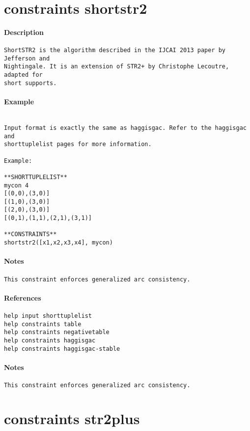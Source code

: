 \section{constraints shortstr2}
\paragraph{Description}
{\footnotesize
\begin{verbatim}
ShortSTR2 is the algorithm described in the IJCAI 2013 paper by Jefferson and
Nightingale. It is an extension of STR2+ by Christophe Lecoutre, adapted for
short supports.
\end{verbatim}
}
\paragraph{Example}
{\footnotesize
\begin{verbatim}

Input format is exactly the same as haggisgac. Refer to the haggisgac and
shorttuplelist pages for more information.

Example:

**SHORTTUPLELIST**
mycon 4
[(0,0),(3,0)]
[(1,0),(3,0)]
[(2,0),(3,0)]
[(0,1),(1,1),(2,1),(3,1)]

**CONSTRAINTS**
shortstr2([x1,x2,x3,x4], mycon)
\end{verbatim}
}
\paragraph{Notes}
{\footnotesize
\begin{verbatim}
This constraint enforces generalized arc consistency.
\end{verbatim}
}
\paragraph{References}
{\footnotesize
\begin{verbatim}
help input shorttuplelist
help constraints table
help constraints negativetable
help constraints haggisgac
help constraints haggisgac-stable
\end{verbatim}
}
\paragraph{Notes}
{\footnotesize
\begin{verbatim}
This constraint enforces generalized arc consistency.
\end{verbatim}
}
\section{constraints str2plus}
